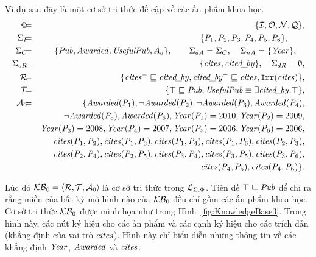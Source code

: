 \begin{Example}
	\label{ex:KnowledgeBase3}
	Ví dụ sau đây là một cơ sở tri thức đề cập về các ấn phẩm khoa học.
	\allowdisplaybreaks
	\begin{eqnarray*}
		\Phi    \!\!\!&=&\!\!\! \{\mI,\mO,\mN,\mQ\},\\
		\SigmaI \!\!\!&=&\!\!\! \{\Pub_1, \Pub_2, \Pub_3, \Pub_4, \Pub_5, \Pub_6\},\qquad\\
		\SigmaC \!\!\!&=&\!\!\! \{\Publication, \Awarded, \UsefulPub, A_d\}, \qquad \SigmaDA = \SigmaC, \quad \SigmaNA = \{\PubYear\}, \quad\\
		\SigmaOR \!\!\!&=&\!\!\! \{\Cites, \Citedby\}, \quad \SigmaDR = \emptyset,\\
		\mR    \!\!\!&=&\!\!\! \{\Cites^- \sqsubseteq \Citedby, \Citedby^- \sqsubseteq \Cites, \Irr(\Cites) \}, \\
		\mT    \!\!\!&=&\!\!\! \{\top \sqsubseteq \Publication, \UsefulPub \equiv \E \Citedby.\top\},\\
		\mA_0 \!\!\!&=&\!\!\! \{\Awarded(\Pub_1), \neg\Awarded(\Pub_2), \neg\Awarded(\Pub_3), \Awarded(\Pub_4), \\
		\!\!\!& & \neg\Awarded(\Pub_5), \Awarded(\Pub_6), 
		\PubYear(\Pub_1) = 2010, \PubYear(\Pub_2) = 2009, \\
		\!\!\!& & \PubYear(\Pub_3) = 2008, \PubYear(\Pub_4) = 2007, 
		\PubYear(\Pub_5) = 2006, \PubYear(\Pub_6) = 2006, \\
		\!\!\!& & \Cites(\Pub_1, \Pub_2), \Cites(\Pub_1, \Pub_3), \Cites(\Pub_1, \Pub_4), 
		\Cites(\Pub_1, \Pub_6), \Cites(\Pub_2, \Pub_3), \\
		\!\!\!& & \Cites(\Pub_2, \Pub_4), \Cites(\Pub_2, \Pub_5), \Cites(\Pub_3, \Pub_4), \Cites(\Pub_3, \Pub_5), \Cites(\Pub_3, \Pub_6),\\
		\!\!\!& & \Cites(\Pub_4, \Pub_5), \Cites(\Pub_4, \Pub_6)\}.
	\end{eqnarray*}
	
	Lúc đó $\mathcal{KB}_0 = \left\langle\mathcal{R},\mathcal{T},\mathcal{A}_0\right\rangle\!$ là cơ sở tri thức trong $\mathcal{L}_{\Sigma,\Phi}$. Tiên đề $\top \sqsubseteq \mathit{Pub}$ để chỉ ra rằng miền của bất kỳ mô hình nào của $\mathcal{KB}_0$ đều chỉ gồm các ấn phẩm khoa học.
	Cơ sở tri thức $\mathcal{KB}_0$ được minh họa như trong Hình~\ref{fig:KnowledgeBase3}. Trong hình này, các nút ký hiệu cho các ấn phẩm và các cạnh ký hiệu cho các trích dẫn (khẳng định của vai trò $\mathit{cites}$). Hình này chỉ biểu diễn những thông tin về các khẳng định $\mathit{Year}$, $\mathit{Awarded}$ và $\mathit{cites}$.\myend
\end{Example}

